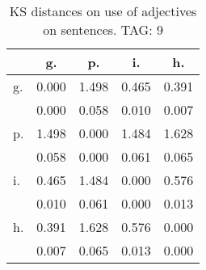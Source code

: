 \begin{table}[h!]
\begin{center}
\begin{tabular}{| l | c | c | c | c |}\hline
 & g. & p. & i. & h. \\\hline
g. & 0.000  & 1.498  & 0.465  & 0.391 \\\hline
 & 0.000  & 0.058  & 0.010  & 0.007 \\\hline
p. & 1.498  & 0.000  & 1.484  & 1.628 \\\hline
 & 0.058  & 0.000  & 0.061  & 0.065 \\\hline
i. & 0.465  & 1.484  & 0.000  & 0.576 \\\hline
 & 0.010  & 0.061  & 0.000  & 0.013 \\\hline
h. & 0.391  & 1.628  & 0.576  & 0.000 \\\hline
 & 0.007  & 0.065  & 0.013  & 0.000 \\\hline
\end{tabular}
\caption{KS distances on use of adjectives on sentences. TAG: 9}
\end{center}
\end{table}